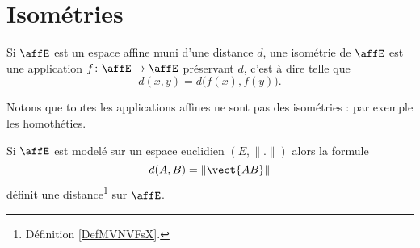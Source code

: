 \section{Isométries}

\begin{definition}       \label{DEFooZGKBooGgjkgs}
	Si \( \affE\) est un espace affine muni d'une distance \( d\), une isométrie de \( \affE\) est une application \( f\colon \affE\to \affE\) préservant \( d\), c'est à dire telle que
	\begin{equation}
		d( x,y )=d\big( f(x), f(y) \big).
	\end{equation}
\end{definition}
Notons que toutes les applications affines ne sont pas des isométries : par exemple les homothéties.

\begin{proposition}     \label{PROPooHSOGooBbFTYt}
	Si \( \affE\) est modelé sur un espace euclidien \( (E,\| . \|)\) alors la formule
	\begin{equation}
		d(A,B)=\| \vect{ AB } \|
	\end{equation}
	définit une distance\footnote{Définition \ref{DefMVNVFsX}.} sur \( \affE\).
\end{proposition}

